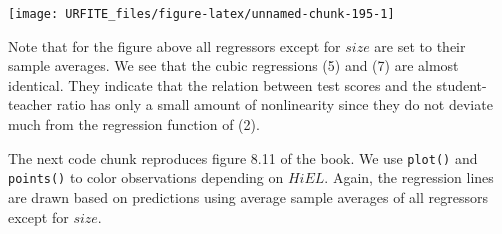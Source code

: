 \documentclass[]{book}
\newenvironment{Shaded}{\begin{snugshade}}{\end{snugshade}}
\newcommand{\KeywordTok}[1]{\textcolor[rgb]{0.13,0.29,0.53}{\textbf{#1}}}
\newcommand{\DataTypeTok}[1]{\textcolor[rgb]{0.13,0.29,0.53}{#1}}
\newcommand{\DecValTok}[1]{\textcolor[rgb]{0.00,0.00,0.81}{#1}}
\newcommand{\FloatTok}[1]{\textcolor[rgb]{0.00,0.00,0.81}{#1}}
\newcommand{\StringTok}[1]{\textcolor[rgb]{0.31,0.60,0.02}{#1}}
\newcommand{\CommentTok}[1]{\textcolor[rgb]{0.56,0.35,0.01}{\textit{#1}}}
\newcommand{\OperatorTok}[1]{\textcolor[rgb]{0.81,0.36,0.00}{\textbf{#1}}}
\newcommand{\NormalTok}[1]{#1}
\theoremstyle{definition}
\theoremstyle{definition}
\theoremstyle{definition}
\theoremstyle{remark}
\begin{document}
\begin{Shaded}
\end{Shaded}

\begin{center}\texttt{[image: URFITE\_files/figure-latex/unnamed-chunk-195-1]} \end{center}

Note that for the figure above all regressors except for \(size\) are
set to their sample averages. We see that the cubic regressions (5) and
(7) are almost identical. They indicate that the relation between test
scores and the student-teacher ratio has only a small amount of
nonlinearity since they do not deviate much from the regression function
of (2).

The next code chunk reproduces figure 8.11 of the book. We use
\texttt{plot()} and \texttt{points()} to color observations depending on
\(HiEL\). Again, the regression lines are drawn based on predictions
using average sample averages of all regressors except for \(size\).
\end{document}
